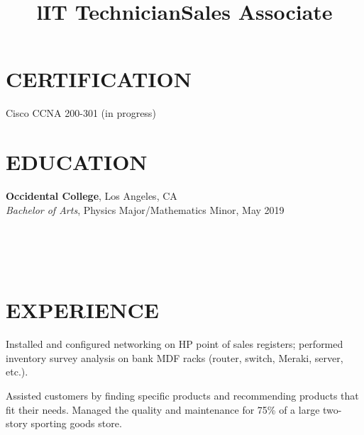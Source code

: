 \documentclass[margin]{res}
\begin{document}
\begin{resume}

	\section{CERTIFICATION}
	Cisco CCNA 200-301 (in progress)


\section{EDUCATION}
\textbf{Occidental College}, Los Angeles, CA\\
{\sl Bachelor of Arts}, Physics Major/Mathematics Minor, May 2019\hfill 


\begin{format}
\title{l}\\
\\
\body\\
\end{format}

\section{EXPERIENCE}
\title{\textbf{IT Technician}}
\begin{position}
	Installed and configured networking on HP point of sales registers; performed inventory survey analysis on bank MDF racks (router, switch, Meraki, server, etc.).
\end{position}

\title{\textbf{Sales Associate}}
\begin{position}
	Assisted customers by finding specific products and recommending products that fit their needs. Managed the quality and maintenance for 75\% of a large two-story sporting goods store.	
\end{position}


\end{resume}
\end{document}
